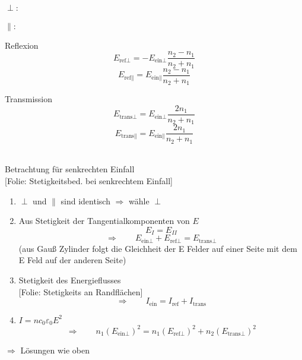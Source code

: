 \documentclass[titlepage,11pt,a4paper,ngerman]{report}
\newcommand{\tx}[1]{\textrm{#1}}
\newcommand{\folie}[1]{\color{gray}[Folie: #1]\color{black}}
\renewcommand{\epsilon}{\varepsilon}
\begin{document}
\begin{minipage}{.05\linewidth}
	$ \perp : $ \\\\[5pt] $ \parallel : $
\end{minipage}%
\begin{minipage}{.45\linewidth}
	\centering
	Reflexion
	\begin{equation*}
	E_{\tx{ref} \perp} = - E_{\tx{ein} \perp} \frac{n_2 - n_1}{n_2 + n_1}
	\end{equation*}
	\begin{equation*}
	E_{\tx{ref} \parallel} = E_{\tx{ein} \parallel} \frac{n_2 - n_1}{n_2 + n_1} 
	\end{equation*}
	\vspace{10pt}
\end{minipage}\nolinebreak%
\begin{minipage}{.45\linewidth}
	\centering
	Transmission
	\begin{equation*}
	E_{\tx{trans} \perp} = E_{\tx{ein} \perp} \frac{2 n_1}{n_2 + n_1}
	\end{equation*}
	\begin{equation*}
	E_{\tx{trans} \parallel} = E_{\tx{ein} \parallel} \frac{2 n_1}{n_2 + n_1}
	\end{equation*}
	\vspace{10pt}
\end{minipage}%
\\
Betrachtung für senkrechten Einfall\\
\folie{Stetigkeitsbed. bei senkrechtem Einfall}
\begin{enumerate}[(1)]
	\item $ \perp $ und $ \parallel $ sind identisch $ \Rightarrow $ wähle $ \perp $
	\item Aus Stetigkeit der Tangentialkomponenten von $ E $
	\begin{equation*}
	E_{I} = E_{II}
	\end{equation*}
	\begin{equation*}
	\Rightarrow \qquad E_{\tx{ein} \perp} + E_{\tx{ref} \perp} = E_{\tx{trans} \perp}
	\end{equation*}
	(aus Gauß Zylinder folgt die Gleichheit der E Felder auf einer Seite mit dem E Feld auf der anderen Seite)
	\item Stetigkeit des Energieflusses\\
	\folie{Stetigkeits an Randflächen}
	\begin{equation*}
	\Rightarrow \qquad I_{\tx{ein}} = I_{\tx{ref}} + I_{\tx{trans}}
	\end{equation*}
	\item $ I = n c_0 \epsilon_0 E^2 $
	\begin{equation*}
	\Rightarrow \qquad n_1 (E_{\tx{ein} \perp})^2 = n_1 (E_{\tx{ref} \perp})^2 + n_2 (E_{\tx{trans} \perp})^2
	\end{equation*}
\end{enumerate}
$ \Rightarrow $ Lösungen wie oben
\end{document}
